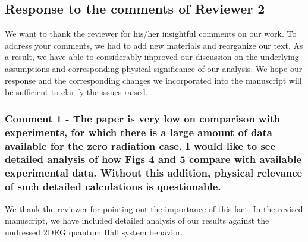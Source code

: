 \documentclass{article}
\begin{document}
\subsection*{Response to the comments of Reviewer 2}

We want to thank the reviewer for his/her insightful comments on our work. To address your comments, we had to add new materials and reorganize our text. As a result, we have able to considerably improved our discussion on the underlying assumptions and corresponding physical significance of our analysis. We hope our response and the corresponding changes we incorporated into the manuscript will be sufficient to clarify the issues raised.


\subsubsection*{Comment 1 -
\color{RoyalBlue} The paper is very low on comparison with experiments, for which there is a large amount of data available for the zero radiation case. I would like to see detailed analysis of how Figs 4 and 5 compare with available
experimental data. Without this addition, physical relevance of such
detailed calculations is questionable.
}

We thank the reviewer for pointing out the importance of this fact. In the revised manuscript, we have included detailed analysis of our results against the undressed 2DEG quantum Hall system behavior.
\end{document}
